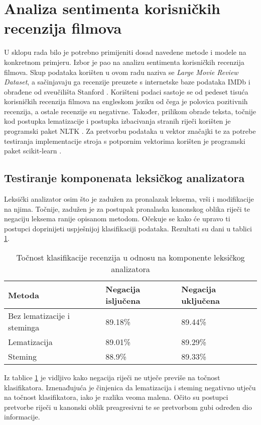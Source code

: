 \documentclass[times, utf8, zavrsni, numeric]{fer}
\begin{document}
\section{Analiza sentimenta korisničkih recenzija filmova} \label{sec:rec}
U sklopu rada bilo je potrebno primijeniti dosad navedene metode i modele na konkretnom primjeru.
Izbor je pao na analizu sentimenta korisničkih recenzija filmova.
Skup podataka korišten u ovom radu naziva se \textit{Large Movie Review Dataset}, a sačinjavaju ga 
recenzije preuzete s internetske baze podataka IMDb i obrađene od sveučilišta 
Stanford \cite{maas-EtAl:2011:ACL-HLT2011}.
Korišteni podaci sastoje se od pedeset tisuća korisničkih recenzija filmova na engleskom jeziku
od čega je polovica pozitivnih recenzija, a ostale recenzije su negativne. 
Također, prilikom obrade teksta, točnije kod postupka lematizacije i postupka izbacivanja
stranih riječi korišten je programski paket NLTK \cite{Loper:2002:NNL:1118108.1118117}.
Za pretvorbu podataka u vektor značajki te za potrebe testiranja implementacije 
stroja s potpornim vektorima korišten je programski paket scikit-learn \cite{scikit-learn}.

\subsection{Testiranje komponenata leksičkog analizatora}
Leksički analizator osim što je zadužen za pronalazak leksema, vrši i modifikacije na njima.
Točnije, zadužen je za postupak pronalaska kanonskog oblika riječi te negaciju leksema ranije opisanom
metodom.
Očekuje se kako će upravo ti postupci doprinijeti uspješnijoj klasifikaciji podataka.
Rezultati su dani u tablici \ref{tab:la}.

\begin{table}
    \center
    \begin{tabular}{| l | l | l |}
    \hline
    Metoda & Negacija isljučena & Negacija uključena \\ \hline
    Bez lematizacije i steminga & 89.18\% & 89.44\% \\ \hline
    Lematizacija & 89.01\% & 89.29\% \\ \hline
    Steming & 88.9\% & 89.33\% \\
    \hline
    \end{tabular}
    \caption{Točnost klasifikacije recenzija u odnosu na komponente leksičkog analizatora}
    \label{tab:la}
\end{table}

Iz tablice \ref{tab:la} je vidljivo kako negacija riječi ne utječe previše na točnost klasifikatora.
Iznenađujuća je činjenica da lematizacija i steming negativno utječu na točnost klasifikatora, iako
je razlika veoma malena. 
Očito su postupci pretvorbe riječi u kanonski oblik preagresivni te se pretvorbom gubi određen dio 
informacije.
\end{document}
